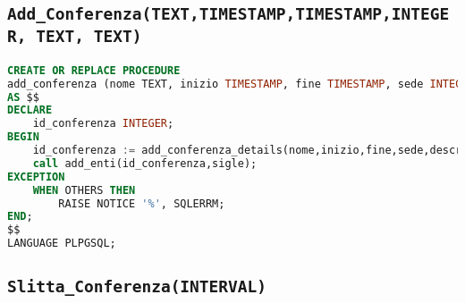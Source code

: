 \subsection{\texttt{Add\_Conferenza(TEXT,TIMESTAMP,TIMESTAMP,INTEGER, TEXT, TEXT)}}
\begin{lstlisting}[language=SQL,style=mystyle]
CREATE OR REPLACE PROCEDURE 
add_conferenza (nome TEXT, inizio TIMESTAMP, fine TIMESTAMP, sede INTEGER, descrizione TEXT, sigle TEXT,utente INTEGER)
AS $$
DECLARE
	id_conferenza INTEGER;
BEGIN
	id_conferenza := add_conferenza_details(nome,inizio,fine,sede,descrizione,utente);
	call add_enti(id_conferenza,sigle);
EXCEPTION
	WHEN OTHERS THEN
		RAISE NOTICE '%', SQLERRM;
END;
$$ 
LANGUAGE PLPGSQL;
\end{lstlisting}
\subsection{\texttt{Slitta\_Conferenza(INTERVAL)}}

